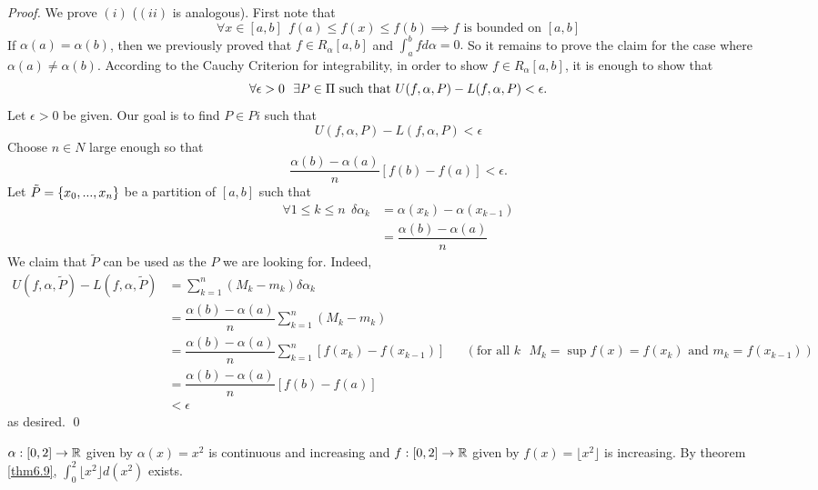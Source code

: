 \begin{proof}
    We prove $(i)$ ($(ii)$ is analogous). First note that
    $$\forall x \in [a,b] ~~f(a) \leq f(x) \leq f(b) \implies f \text{ is bounded on } [a,b]$$
    If $\alpha(a) = \alpha(b)$, then we previously proved that $f\in R_\alpha[a,b]$ and $\int_{a}^{b}f d\alpha = 0.$ So it remains to prove the claim for the case where $\alpha(a) \neq \alpha(b)$. According to the Cauchy Criterion for integrability, in order to show $f \in R_\alpha [a,b]$, it is enough to show that
    $$\forall \epsilon > 0 ~~\exists P \in \Pi \text{ such that } U(f, \alpha, P) - L(f, \alpha, P) < \epsilon.$$
    Let $\epsilon > 0$ be given. Our goal is to find $P \in Pi$ such that
    $$U(f, \alpha, P) - L(f, \alpha, P) < \epsilon$$
    Choose $n \in N$ large enough so that 
    $$\dfrac{\alpha(b) - \alpha(a)}{n}[f(b)-f(a)] < \epsilon.$$
    Let $\tilde{P}=\left\{x_0,...,x_n\right\}$ be a partition of $[a,b]$ such that
    \begin{align*}
        \forall 1 \leq k \leq n ~~\delta \alpha_k &= \alpha(x_k) - \alpha(x_{k-1}) \\ 
        &= \dfrac{\alpha(b) - \alpha(a)}{n}
    \end{align*}
    We claim that $\tilde{P}$ can be used as the $P$ we are looking for. Indeed,
    \begin{align*}
        U(f, \alpha, \tilde{P}) - L(f, \alpha, \tilde{P}) &= \sum_{k=1}^{n}(M_k - m_k) \delta \alpha_k \\
        &= \dfrac{\alpha(b) - \alpha(a)}{n}\sum_{k=1}^{n}(M_k - m_k) \\
        &= \dfrac{\alpha(b) - \alpha(a)}{n}\sum_{k=1}^{n}[f(x_k) - f(x_{k-1})] &&(\text{for all $k$ $M_k = \sup f(x) = f(x_k)$ and $m_k = f(x_{k-1})$}) \\
        &= \dfrac{\alpha(b) - \alpha(a)}{n}[f(b) - f(a)] \\
        &< \epsilon
    \end{align*}
    as desired.
    \qed
\end{proof}

\begin{example}
    $\alpha:[0,2] \to \mathbb{R}$ given by $\alpha(x) = x^2$ is continuous and increasing and $f:[0,2] \to \mathbb{R}$ given by $f(x) = \lfloor x^2 \rfloor$ is increasing. By theorem \ref{thm6.9}, $\int_{0}^{2}\lfloor x^2 \rfloor d(x^2)$ exists.
\end{example}

